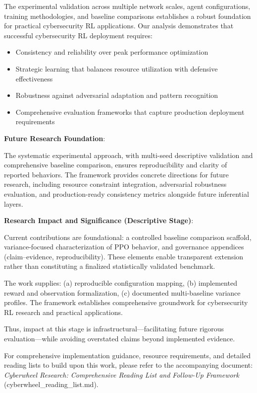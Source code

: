 \documentclass[12pt,oneside,a4paper]{article}
\theoremstyle{definition}
\theoremstyle{plain}
\begin{document}
The experimental validation across multiple network scales, agent configurations, training methodologies, and baseline comparisons establishes a robust foundation for practical cybersecurity RL applications. Our analysis demonstrates that successful cybersecurity RL deployment requires:
\begin{itemize}
\item Consistency and reliability over peak performance optimization
\item Strategic learning that balances resource utilization with defensive effectiveness
\item Robustness against adversarial adaptation and pattern recognition
\item Comprehensive evaluation frameworks that capture production deployment requirements
\end{itemize}

\textbf{Future Research Foundation}:

The systematic experimental approach, with multi-seed descriptive validation and comprehensive baseline comparison, ensures reproducibility and clarity of reported behaviors. The framework provides concrete directions for future research, including resource constraint integration, adversarial robustness evaluation, and production-ready consistency metrics alongside future inferential layers.

	\textbf{Research Impact and Significance (Descriptive Stage)}:

Current contributions are foundational: a controlled baseline comparison scaffold, variance-focused characterization of PPO behavior, and governance appendices (claim–evidence, reproducibility). These elements enable transparent extension rather than constituting a finalized statistically validated benchmark.

The work supplies: (a) reproducible configuration mapping, (b) implemented reward and observation formalization, (c) documented multi-baseline variance profiles. The framework establishes comprehensive groundwork for cybersecurity RL research and practical applications.

Thus, impact at this stage is infrastructural—facilitating future rigorous evaluation—while avoiding overstated claims beyond implemented evidence.

For comprehensive implementation guidance, resource requirements, and detailed reading lists to build upon this work, please refer to the accompanying document: \textit{Cyberwheel Research: Comprehensive Reading List and Follow-Up Framework} (cyberwheel\_reading\_list.md).
\end{document}

